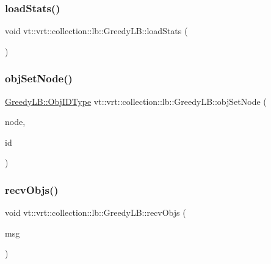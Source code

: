 \subsubsection{\texorpdfstring{load\+Stats()}{loadStats()}}
{\footnotesize\ttfamily void vt\+::vrt\+::collection\+::lb\+::\+Greedy\+L\+B\+::load\+Stats (\begin{DoxyParamCaption}{ }\end{DoxyParamCaption})\hspace{0.3cm}{\ttfamily [private]}}

\mbox{\label{structvt_1_1vrt_1_1collection_1_1lb_1_1_greedy_l_b_a38efce04a8fabdc16d89331b639f534f}} 
\subsubsection{\texorpdfstring{obj\+Set\+Node()}{objSetNode()}}
{\footnotesize\ttfamily \hyperlink{structvt_1_1vrt_1_1collection_1_1lb_1_1_base_l_b_a790b22acf448880599724749cdc4e9b3}{Greedy\+L\+B\+::\+Obj\+I\+D\+Type} vt\+::vrt\+::collection\+::lb\+::\+Greedy\+L\+B\+::obj\+Set\+Node (\begin{DoxyParamCaption}\item[{\hyperlink{namespacevt_a866da9d0efc19c0a1ce79e9e492f47e2}{Node\+Type} const \&}]{node,  }\item[{\hyperlink{structvt_1_1vrt_1_1collection_1_1lb_1_1_base_l_b_a790b22acf448880599724749cdc4e9b3}{Obj\+I\+D\+Type} const \&}]{id }\end{DoxyParamCaption})\hspace{0.3cm}{\ttfamily [private]}}

\mbox{\label{structvt_1_1vrt_1_1collection_1_1lb_1_1_greedy_l_b_a984461093fa3a1a5f8be9444d3e4c3f4}} 
\subsubsection{\texorpdfstring{recv\+Objs()}{recvObjs()}}
{\footnotesize\ttfamily void vt\+::vrt\+::collection\+::lb\+::\+Greedy\+L\+B\+::recv\+Objs (\begin{DoxyParamCaption}\item[{\hyperlink{structvt_1_1vrt_1_1collection_1_1lb_1_1_greedy_send_msg}{Greedy\+Send\+Msg} $\ast$}]{msg }\end{DoxyParamCaption})\hspace{0.3cm}{\ttfamily [private]}}

